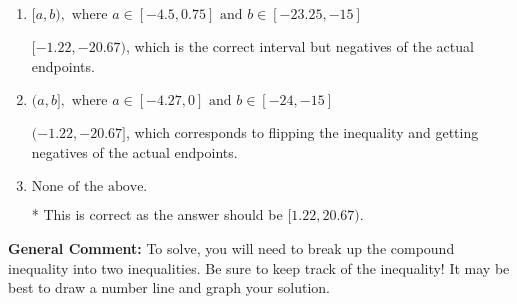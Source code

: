 \documentclass{extbook}[14pt]
\begin{document}
\begin{enumerate}
{\begin{enumerate}[label=\Alph*.]
$(-\infty, -1.22) \cup [-20.67, \infty)$, which corresponds to displaying the and-inequality as an or-inequality AND flipping the inequality AND getting negatives of the actual endpoints.
\item \( [a, b), \text{ where } a \in [-4.5, 0.75] \text{ and } b \in [-23.25, -15] \)

$[-1.22, -20.67)$, which is the correct interval but negatives of the actual endpoints.
\item \( (a, b], \text{ where } a \in [-4.27, 0] \text{ and } b \in [-24, -15] \)

$(-1.22, -20.67]$, which corresponds to flipping the inequality and getting negatives of the actual endpoints.
\item \( \text{None of the above.} \)

* This is correct as the answer should be $[1.22, 20.67)$.
\end{enumerate}

\textbf{General Comment:} To solve, you will need to break up the compound inequality into two inequalities. Be sure to keep track of the inequality! It may be best to draw a number line and graph your solution.
}
\end{enumerate}
\end{document}
